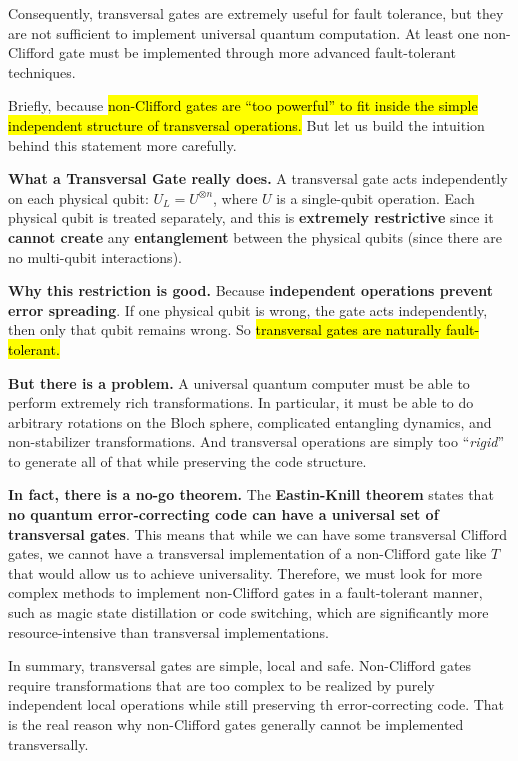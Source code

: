 \highspace
Consequently, transversal gates are extremely useful for fault tolerance, but they are not sufficient to implement universal quantum computation. At least one non-Clifford gate must be implemented through more advanced fault-tolerant techniques.

\begin{deepeningbox}
    Briefly, because \hl{non-Clifford gates are ``too powerful'' to fit inside the simple independent structure of transversal operations.} But let us build the intuition behind this statement more carefully.

    \highspace
    \textcolor{Green3}{ \textbf{What a Transversal Gate really does.}} A transversal gate acts independently on each physical qubit: $U_L = U^{\otimes n}$, where $U$ is a single-qubit operation. Each physical qubit is treated separately, and this is \textbf{extremely restrictive} since it \textbf{cannot create} any \textbf{entanglement} between the physical qubits (since there are no multi-qubit interactions).

    \highspace
    \textcolor{Green3}{ \textbf{Why this restriction is good.}} Because \textbf{independent operations prevent error spreading}. If one physical qubit is wrong, the gate acts independently, then only that qubit remains wrong. So \hl{transversal gates are naturally fault-tolerant.}

    \highspace
    \textcolor{Red2}{ \textbf{But there is a problem.}} A universal quantum computer must be able to perform extremely rich transformations. In particular, it must be able to do arbitrary rotations on the Bloch sphere, complicated entangling dynamics, and non-stabilizer transformations. And transversal operations are simply too ``\emph{rigid}'' to generate all of that while preserving the code structure.

    \highspace
    \textcolor{Red2}{ \textbf{In fact, there is a no-go theorem.}} The \textbf{Eastin-Knill theorem}\cite{eastin2009restrictions} states that \textbf{no quantum error-correcting code can have a universal set of transversal gates}. This means that while we can have some transversal Clifford gates, we cannot have a transversal implementation of a non-Clifford gate like $T$ that would allow us to achieve universality. Therefore, we must look for more complex methods to implement non-Clifford gates in a fault-tolerant manner, such as magic state distillation or code switching, which are significantly more resource-intensive than transversal implementations.

    \highspace
    In summary, transversal gates are simple, local and safe. Non-Clifford gates require transformations that are too complex to be realized by purely independent local operations while still preserving th error-correcting code. That is the real reason why non-Clifford gates generally cannot be implemented transversally.
\end{deepeningbox}

